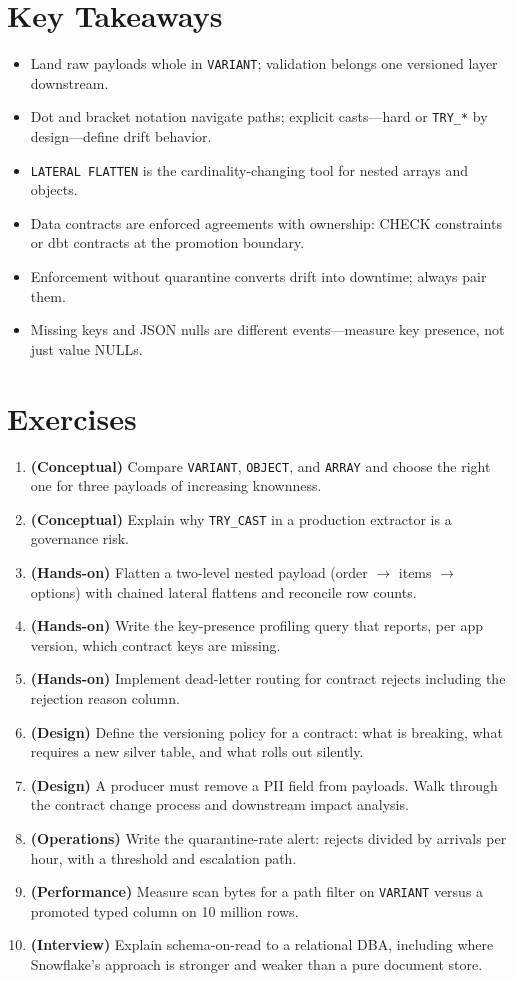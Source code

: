 \section*{Key Takeaways}
\begin{itemize}
    \item Land raw payloads whole in \texttt{VARIANT}; validation belongs one versioned layer downstream.
    \item Dot and bracket notation navigate paths; explicit casts---hard or \texttt{TRY\_*} by design---define drift behavior.
    \item \texttt{LATERAL FLATTEN} is the cardinality-changing tool for nested arrays and objects.
    \item Data contracts are enforced agreements with ownership: CHECK constraints or dbt contracts at the promotion boundary.
    \item Enforcement without quarantine converts drift into downtime; always pair them.
    \item Missing keys and JSON nulls are different events---measure key presence, not just value NULLs.
\end{itemize}

\section{Exercises}
\begin{enumerate}
    \item \textbf{(Conceptual)} Compare \texttt{VARIANT}, \texttt{OBJECT}, and \texttt{ARRAY} and choose the right one for three payloads of increasing knownness.
    \item \textbf{(Conceptual)} Explain why \texttt{TRY\_CAST} in a production extractor is a governance risk.
    \item \textbf{(Hands-on)} Flatten a two-level nested payload (order $\rightarrow$ items $\rightarrow$ options) with chained lateral flattens and reconcile row counts.
    \item \textbf{(Hands-on)} Write the key-presence profiling query that reports, per app version, which contract keys are missing.
    \item \textbf{(Hands-on)} Implement dead-letter routing for contract rejects including the rejection reason column.
    \item \textbf{(Design)} Define the versioning policy for a contract: what is breaking, what requires a new silver table, and what rolls out silently.
    \item \textbf{(Design)} A producer must remove a PII field from payloads. Walk through the contract change process and downstream impact analysis.
    \item \textbf{(Operations)} Write the quarantine-rate alert: rejects divided by arrivals per hour, with a threshold and escalation path.
    \item \textbf{(Performance)} Measure scan bytes for a path filter on \texttt{VARIANT} versus a promoted typed column on 10 million rows.
    \item \textbf{(Interview)} Explain schema-on-read to a relational DBA, including where Snowflake's approach is stronger and weaker than a pure document store.
\end{enumerate}

